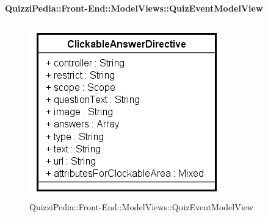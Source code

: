 \paragraph{QuizziPedia::Front-End::ModelViews::QuizEventModelView}
							
\label{QuizziPedia::Front-End::ModelViews::QuizEventModelView}

\begin{figure}[ht]
	\centering
	\includegraphics[scale=0.5,keepaspectratio]{UML/Classi/Front-End/QuizziPedia_Front-end_Templates_ClickableAnswerTemplate.png}
	\caption{QuizziPedia::Front-End::ModelViews::QuizEventModelView}
\end{figure} \FloatBarrier


